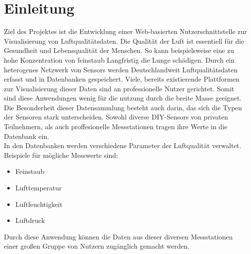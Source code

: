 \section{Einleitung}

Ziel des Projektes ist die Entwicklung einer Web-basierten Nutzerschnittstelle zur Visualisierung von Luftqualitätsdaten.
Die Qualität der Luft ist essentiell für die Gesundheit und Lebensqualität der Menschen. So kann beispielsweise eine zu hohe Konzentration von feinstaub Langfristig die Lunge schädigen. Durch ein heterogenes Netzwerk von \glspl{Sensor} werden Deutschlandweit Luftqualitätsdaten erfasst und in Datenbanken gespeichert.
Viele, bereits existierende Plattformen zur Visualisierung dieser Daten sind an professionelle Nutzer gerichtet. Somit sind diese Anwendungen wenig für die nutzung durch die breite Masse geeignet.
\\
Die Besonderheit dieser Datensammlung besteht auch darin, das sich die Typen der Sensoren stark unterscheiden. Sowohl diverse \gls{DIY}-\glspl{Sensor} von privaten Teilnehmern, als auch proffesionelle Messstationen tragen ihre Werte in die Datenbank ein. 
\\
In den Datenbanken werden verschiedene Parameter der Luftqualität verwaltet. Beispiele für mögliche Messwerte sind:
\begin{itemize} [noitemsep]
    \item Feinstaub
    \item Lufttemperatur
    \item Luftfeuchtigkeit
    \item Luftdruck
\end{itemize}
Durch diese Anwendung können die Daten aus dieser diversen Messstationen einer großen Gruppe von Nutzern zugänglich gemacht werden. 
